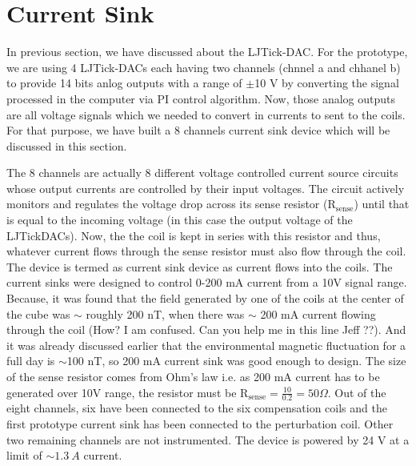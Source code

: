\section{Current Sink}\label{sec:sink}


In previous section, we have discussed about the LJTick-DAC. For the prototype, we are using 4 LJTick-DACs each having two channels (chnnel a and chhanel b) to provide 14 bits anlog outputs with a range of $\pm$10 V by converting the signal processed in the computer via PI control algorithm. Now, those analog outputs are all voltage signals which we needed to convert in currents to sent to the coils. For that purpose, we have built a 8 channels current sink device which will be discussed in this section. 


The 8 channels are actually 8 different voltage controlled current source circuits whose output currents are controlled by their input voltages. The circuit actively monitors and regulates the voltage drop across its sense resistor ($\mathrm{R_{sense}}$) until that is equal to the incoming voltage (in this case the output voltage of the LJTickDACs). Now, the the coil is kept in series with this resistor and thus, whatever current flows through the sense resistor must also flow through the coil. The device is termed as current sink device as current flows into the coils. The current sinks were designed to control 0-200 mA current from a 10V signal range. Because, it was found that the field generated by one of the coils at the center of the cube was $\sim$ roughly 200 nT, when there was $\sim$ 200 mA current flowing through the coil (How? I am confused. Can you help me in this line Jeff ??). And it was already discussed earlier that the environmental magnetic fluctuation for a full day is $\sim$100 nT, so 200 mA current sink was good enough to design. The size of the sense resistor comes from Ohm's law i.e. as 200 mA current has to be generated over 10V range, the resistor must be $\mathrm{R_{sense}}=\frac{10}{0.2}=50 \Omega$. Out of the eight channels, six have been connected to the six compensation coils and the first prototype current sink has been connected to the perturbation coil. Other two remaining channels are not instrumented. The device is powered by 24 V at a limit of $\sim 1.3 \: A$ current. 

